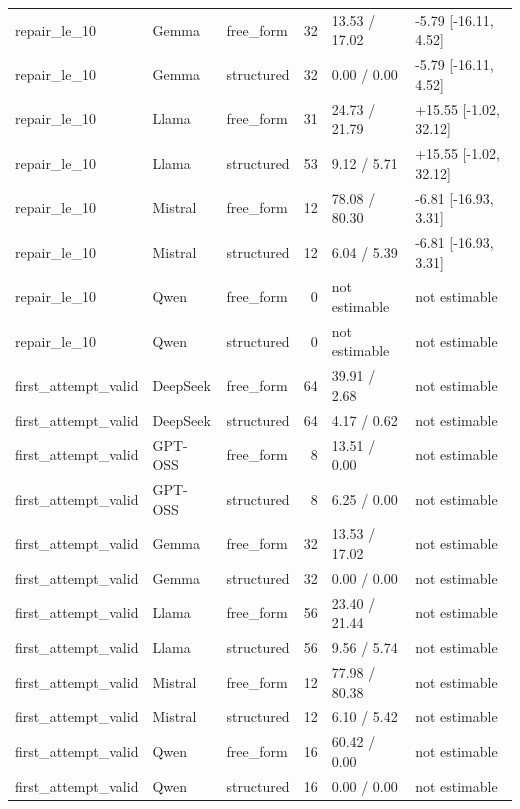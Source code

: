 \begin{longtable}{lllrll}
repair\_le\_10 & Gemma & free\_form & 32 & 13.53 / 17.02 & -5.79 [-16.11, 4.52] \\
repair\_le\_10 & Gemma & structured & 32 & 0.00 / 0.00 & -5.79 [-16.11, 4.52] \\
repair\_le\_10 & Llama & free\_form & 31 & 24.73 / 21.79 & +15.55 [-1.02, 32.12] \\
repair\_le\_10 & Llama & structured & 53 & 9.12 / 5.71 & +15.55 [-1.02, 32.12] \\
repair\_le\_10 & Mistral & free\_form & 12 & 78.08 / 80.30 & -6.81 [-16.93, 3.31] \\
repair\_le\_10 & Mistral & structured & 12 & 6.04 / 5.39 & -6.81 [-16.93, 3.31] \\
repair\_le\_10 & Qwen & free\_form & 0 & not estimable & not estimable \\
repair\_le\_10 & Qwen & structured & 0 & not estimable & not estimable \\
first\_attempt\_valid & DeepSeek & free\_form & 64 & 39.91 / 2.68 & not estimable \\
first\_attempt\_valid & DeepSeek & structured & 64 & 4.17 / 0.62 & not estimable \\
first\_attempt\_valid & GPT-OSS & free\_form & 8 & 13.51 / 0.00 & not estimable \\
first\_attempt\_valid & GPT-OSS & structured & 8 & 6.25 / 0.00 & not estimable \\
first\_attempt\_valid & Gemma & free\_form & 32 & 13.53 / 17.02 & not estimable \\
first\_attempt\_valid & Gemma & structured & 32 & 0.00 / 0.00 & not estimable \\
first\_attempt\_valid & Llama & free\_form & 56 & 23.40 / 21.44 & not estimable \\
first\_attempt\_valid & Llama & structured & 56 & 9.56 / 5.74 & not estimable \\
first\_attempt\_valid & Mistral & free\_form & 12 & 77.98 / 80.38 & not estimable \\
first\_attempt\_valid & Mistral & structured & 12 & 6.10 / 5.42 & not estimable \\
first\_attempt\_valid & Qwen & free\_form & 16 & 60.42 / 0.00 & not estimable \\
first\_attempt\_valid & Qwen & structured & 16 & 0.00 / 0.00 & not estimable \\
\end{longtable}
